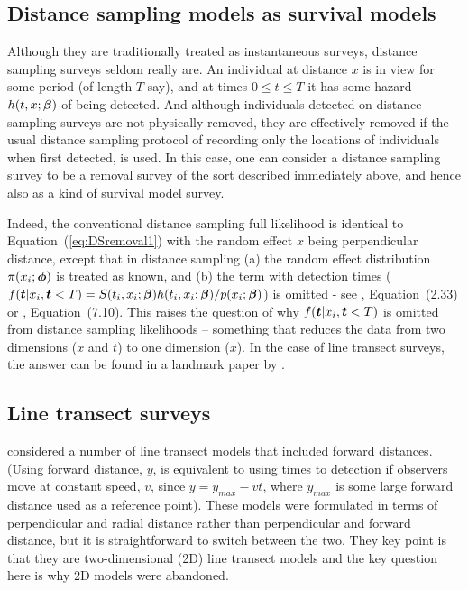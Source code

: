 \documentclass[useAMS,usenatbib,referee]{biom}
\begin{document}
\subsection{Distance sampling models as survival models\label{sec:DS.surv}}

Although they are traditionally treated as instantaneous surveys, distance sampling surveys seldom really are. An individual at distance $x$ is in view for some period (of length $T$ say), and at times $0\leq t\leq T$ it has some hazard $h(t,x;{\mbox{\boldmath $\beta$}})$ of being detected. And although individuals detected on distance sampling surveys are not physically removed, they are effectively removed if the usual distance sampling protocol of recording only the locations of individuals when first detected, is used. In this case, one can consider a distance sampling survey to be a removal survey of the sort described immediately above, and hence also as a kind of survival model survey. 

Indeed, the conventional distance sampling full likelihood is identical to Equation~(\ref{eq:DSremoval1}) with the random effect $x$ being perpendicular distance, except that in distance sampling (a) the random effect distribution $\pi(x_i;{\mbox{\boldmath $\phi$}})$ is treated as known, and (b) the term with detection times ($f(\mbox{\boldmath $t$}|x_i,\mbox{\boldmath $t$}<T)=S(t_i,x_i;{\mbox{\boldmath $\beta$}})h(t_i,x_i;{\mbox{\boldmath $\beta$}})/p(x_i;{\mbox{\boldmath $\beta$}})$) is omitted - see \cite{Buckland+al:04}, Equation~(2.33) or \cite{Borchers+al:02}, Equation~(7.10). This raises the question of why $f(\mbox{\boldmath $t$}|x_i,\mbox{\boldmath $t$}<T)$ is omitted from distance sampling likelihoods -- something that reduces the data from two dimensions ($x$ and $t$) to one dimension ($x$). In the case of line transect surveys, the answer can be found in a landmark paper by \cite{Hayes+Buckland:83}.

\subsection{Line transect surveys}

\cite{Hayes+Buckland:83} considered a number of line transect models that included forward distances. (Using forward distance, $y$, is equivalent to using times to detection if observers move at constant speed, $v$, since $y=y_{max}-vt$, where $y_{max}$ is some large forward distance used as a reference point). These models were formulated in terms of perpendicular and radial distance rather than perpendicular and forward distance, but it is straightforward to switch between the two. They key point is that they are two-dimensional (2D) line transect models and the key question here is why 2D models were abandoned. 
\end{document}
